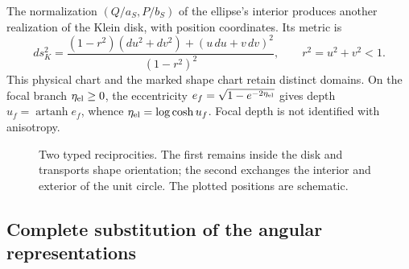 The normalization \((Q/a_S,P/b_S)\) of the ellipse's interior produces another realization of the Klein disk, with position coordinates. Its metric is
\[
 ds_K^2=\frac{(1-r^2)(du^2+dv^2)+(u\,du+v\,dv)^2}{(1-r^2)^2},
 \qquad r^2=u^2+v^2<1.
\]
This physical chart and the marked shape chart retain distinct domains. On the focal branch \(\eta_{\rm el}\ge0\), the eccentricity \(e_f=\sqrt{1-e^{-2\eta_{\rm el}}}\) gives depth \(u_f=\operatorname{artanh}e_f\), whence \(\eta_{\rm el}=\log\cosh u_f\). Focal depth is not identified with anisotropy.

\begin{figure}[htbp]
\centering
{}
\caption{Two typed reciprocities. The first remains inside the disk and transports shape orientation; the second exchanges the interior and exterior of the unit circle. The plotted positions are schematic.}
\label{fig:rec-dos-cartas}
\end{figure}

\subsection{Complete substitution of the angular representations}
\label{rec:sustitucion}

